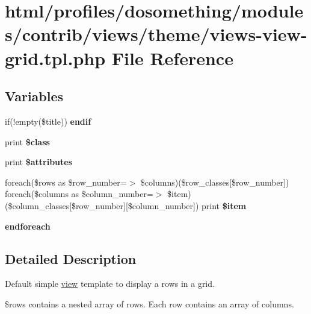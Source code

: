 \hypertarget{views-view-grid_8tpl_8php}{
\section{html/profiles/dosomething/modules/contrib/views/theme/views-\/view-\/grid.tpl.php File Reference}
\label{views-view-grid_8tpl_8php}
}
\subsection*{Variables}
\begin{DoxyCompactItemize}
\item 
\hypertarget{views-view-grid_8tpl_8php_ac0f38e734923b1204c3bc3a9c2d0bd43}{
if(!empty(\$title)) {\bfseries endif}}
\label{views-view-grid_8tpl_8php_ac0f38e734923b1204c3bc3a9c2d0bd43}

\item 
\hypertarget{views-view-grid_8tpl_8php_a37ff9172f25a6ba53d6e3509c4934849}{
print {\bfseries \$class}}
\label{views-view-grid_8tpl_8php_a37ff9172f25a6ba53d6e3509c4934849}

\item 
\hypertarget{views-view-grid_8tpl_8php_a9c88c4272fa40546577b45392a0b3cd3}{
print {\bfseries \$attributes}}
\label{views-view-grid_8tpl_8php_a9c88c4272fa40546577b45392a0b3cd3}

\item 
\hypertarget{views-view-grid_8tpl_8php_a68f49efac465fdf98cf0db09727ba513}{
foreach(\$rows as \$row\_\-number=$>$ \$columns)(\$row\_\-classes\mbox{[}\$row\_\-number\mbox{]}) foreach(\$columns as \$column\_\-number=$>$ \$item)(\$column\_\-classes\mbox{[}\$row\_\-number\mbox{]}\mbox{[}\$column\_\-number\mbox{]}) print {\bfseries \$item}}
\label{views-view-grid_8tpl_8php_a68f49efac465fdf98cf0db09727ba513}

\item 
\hypertarget{views-view-grid_8tpl_8php_a672d9707ef91db026c210f98cc601123}{
{\bfseries endforeach}}
\label{views-view-grid_8tpl_8php_a672d9707ef91db026c210f98cc601123}

\end{DoxyCompactItemize}


\subsection{Detailed Description}
Default simple \hyperlink{classview}{view} template to display a rows in a grid.


\begin{DoxyItemize}
\item \$rows contains a nested array of rows. Each row contains an array of columns. 
\end{DoxyItemize}